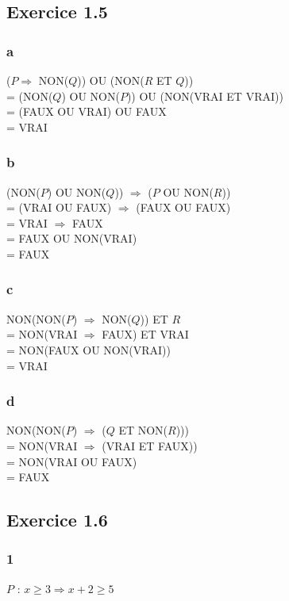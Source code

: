 \documentclass[a4paper,10pt]{report}
\begin{document}
\subsection*{Exercice 1.5}
\subsubsection*{a}
($P \Longrightarrow$ NON($Q$)) OU (NON($R$ ET $Q$)) \\
= (NON($Q$) OU NON($P$)) OU (NON(VRAI ET VRAI)) \\
= (FAUX OU VRAI) OU FAUX \\
= VRAI

\subsubsection*{b}
(NON($P$) OU NON($Q$)) $\Longrightarrow$ ($P$ OU NON($R$)) \\
= (VRAI OU FAUX) $\Longrightarrow$ (FAUX OU FAUX) \\
= VRAI $\Longrightarrow$ FAUX \\
= FAUX OU NON(VRAI) \\
= FAUX

\subsubsection*{c}
NON(NON($P$) $\Longrightarrow$ NON($Q$)) ET $R$ \\
= NON(VRAI $\Longrightarrow$ FAUX) ET VRAI \\
= NON(FAUX OU NON(VRAI)) \\
= VRAI

\subsubsection*{d}
NON(NON($P$) $\Longrightarrow$ ($Q$ ET NON($R$))) \\
= NON(VRAI $\Longrightarrow$ (VRAI ET FAUX)) \\
= NON(VRAI OU FAUX) \\
= FAUX


\subsection*{Exercice 1.6}
\subsubsection*{1}
$P$ : $x\geq3 \Longrightarrow x+2 \geq 5 $
\end{document}
